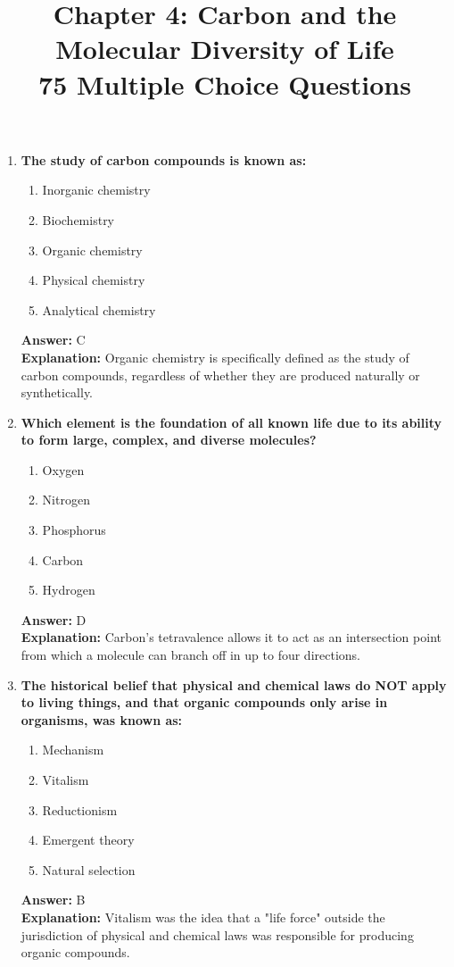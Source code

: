 \documentclass[11pt, a4paper]{article}
\title{\textbf{Chapter 4: Carbon and the Molecular Diversity of Life \\ 75 Multiple Choice Questions}}
\author{}
\date{}
\begin{document}
\maketitle

\begin{enumerate}


\item \textbf{The study of carbon compounds is known as:}
\begin{enumerate}[label=\Alph*.]
    \item Inorganic chemistry
    \item Biochemistry
    \item Organic chemistry
    \item Physical chemistry
    \item Analytical chemistry
\end{enumerate}
\textbf{Answer:} C \\
\textbf{Explanation:} Organic chemistry is specifically defined as the study of carbon compounds, regardless of whether they are produced naturally or synthetically.

\item \textbf{Which element is the foundation of all known life due to its ability to form large, complex, and diverse molecules?}
\begin{enumerate}[label=\Alph*.]
    \item Oxygen
    \item Nitrogen
    \item Phosphorus
    \item Carbon
    \item Hydrogen
\end{enumerate}
\textbf{Answer:} D \\
\textbf{Explanation:} Carbon's tetravalence allows it to act as an intersection point from which a molecule can branch off in up to four directions.

\item \textbf{The historical belief that physical and chemical laws do NOT apply to living things, and that organic compounds only arise in organisms, was known as:}
\begin{enumerate}[label=\Alph*.]
    \item Mechanism
    \item Vitalism
    \item Reductionism
    \item Emergent theory
    \item Natural selection
\end{enumerate}
\textbf{Answer:} B \\
\textbf{Explanation:} Vitalism was the idea that a "life force" outside the jurisdiction of physical and chemical laws was responsible for producing organic compounds.


\end{enumerate}
\end{document}
